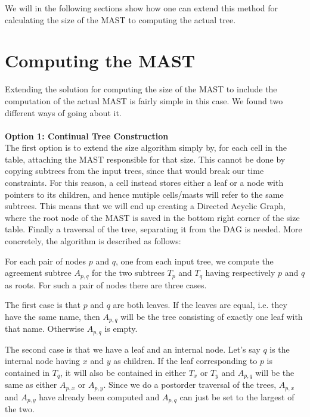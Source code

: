 We will in the following sections show how one can extend this method for calculating the size of the MAST to computing the actual tree.


\section{Computing the MAST}
Extending the solution for computing the size of the MAST to include the computation of the actual MAST is fairly simple in this case. We found two different ways of going about it. 
\\
\\
\textbf{Option 1: Continual Tree Construction} \\
The first option is to extend the size algorithm simply by, for each cell in the table, attaching the MAST responsible for that size. This cannot be done by copying subtrees from the input trees, since that would break our time constraints. For this reason, a cell instead stores either a leaf or a node with pointers to its children, and hence mutiple cells/masts will refer to the same subtrees. This means that we will end up creating a Directed Acyclic Graph, where the root node of the MAST is saved in the bottom right corner of the size table. Finally a traversal of the tree, separating it from the DAG is needed.
More concretely, the algorithm is described as follows: 

For each pair of nodes $p$ and $q$, one from each input tree, we compute the agreement subtree $A_{p,q}$ for the two subtrees $T_p$ and $T_q$ having respectively $p$ and $q$ as roots. For such a pair of nodes there are three cases.

The first case is that $p$ and $q$ are both leaves. If the leaves are equal, i.e. they have the same name, then $A_{p,q}$ will be the tree consisting of exactly one leaf with that name. Otherwise $A_{p,q}$ is empty.

The second case is that we have a leaf and an internal node. Let's say $q$ is the internal node having $x$ and $y$ as children. If the leaf corresponding to $p$ is contained in $T_q$, it will also be contained in either $T_x$ or $T_y$ and $A_{p,q}$ will be the same as either $A_{p,x}$ or $A_{p,y}$. Since we do a postorder traversal of the trees, $A_{p,x}$ and $A_{p,y}$ have already been computed and $A_{p,q}$ can just be set to the largest of the two.

